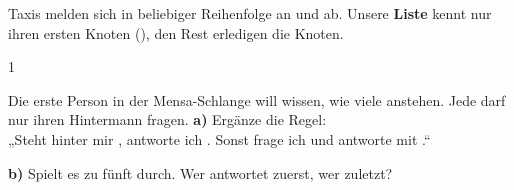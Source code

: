 \documentclass[11pt,a4paper]{article}
\begin{document}

Taxis melden sich in beliebiger Reihenfolge an und ab. Unsere \textbf{Liste} kennt nur ihren ersten Knoten (), den Rest erledigen die Knoten. 

\begin{aufgabe}{1}
\begin{minipage}[t]{0.56\linewidth}
\vspace{0pt}\raggedright
Die erste Person in der Mensa-Schlange will wissen, wie viele anstehen. Jede darf nur ihren Hintermann fragen. \textbf{a)} Ergänze die Regel:\\[1mm]
„Steht hinter mir , antworte ich . Sonst frage ich  und antworte mit .“
\end{minipage}\hfill
\begin{minipage}[t]{0.41\linewidth}
\vspace{0pt}\raggedright
\textbf{b)} Spielt es zu fünft durch. Wer antwortet zuerst, wer zuletzt?\\
\\[1mm]
\end{minipage}
\end{aufgabe}
\end{document}
